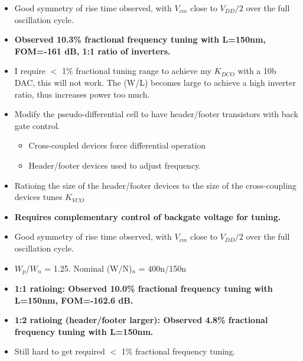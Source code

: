 			\begin{itemize}[itemsep=4pt,label=\protect---]
				\item Good symmetry of rise time observed, with $V_{cm}$ close to $V_{DD}/2$ over the full oscillation cycle.
				\item \textbf{Observed 10.3\% fractional frequency tuning with L=150nm, FOM=-161 dB, 1:1 ratio of inverters.}
				\item I require $<$ 1\% fractional tuning range to achieve my $K_{DCO}$ with a 10b DAC, this will not work. The (W/L) becomes large to achieve a high inverter ratio, thus increases power too much.
			\end{itemize}



			\begin{itemize}[itemsep=4pt,label=\protect---]
				\item Modify the pseudo-differential cell to have header/footer transistors with back gate control.
				\begin{itemize}[itemsep=4pt,label=$\bullet$]
					\item Cross-coupled devices force differential operation
					\item Header/footer devices used to adjust frequency.
				\end{itemize}				
				\item Ratioing the size of the header/footer devices to the size of the cross-coupling devices tunes $K_{VCO}$
				\item \textbf{Requires complementary control of backgate voltage for tuning.}
			\end{itemize}



			\begin{itemize}[itemsep=4pt,label=\protect---]
				\item Good symmetry of rise time observed, with $V_{cm}$ close to $V_{DD}/2$ over the full oscillation cycle.
				\item $W_p$/$W_n$ = 1.25. Nominal (W/N)$_n$ = 400n/150n
				\item \textbf{1:1 ratioing: Observed 10.0\% fractional frequency tuning with L=150nm, {\color{red}FOM=-162.6 dB.}}
				\item \textbf{1:2 ratioing (header/footer larger): Observed 4.8\% fractional frequency tuning with L=150nm.}
				\item Still hard to get required $<$ 1\% fractional frequency tuning.
			\end{itemize}

